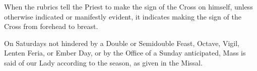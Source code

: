 \begin{description}
    When the rubrics tell the Priest to make the sign of the Cross on himself, unless otherwise indicated or manifestly evident, it indicates making the sign of the Cross from forehead to breast.
    \item[Votive Mass of Our Lady on Saturday] On Saturdays not hindered by a Double or Semidouble Feast, Octave, Vigil, Lenten Feria, or Ember Day, or by the Office of a Sunday anticipated, Mass is said of our Lady according to the season, as given in the Missal.\par
\end{description}